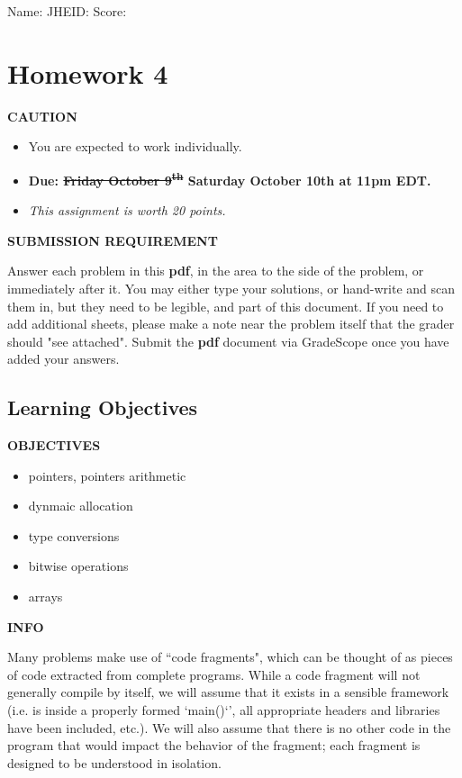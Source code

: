 \documentclass[12pt]{article}
\def \HWNumber {4}
\def \HWDueDate {\sout{Friday October 9\textsuperscript{th}} Saturday October 10th at 11pm EDT}
\newenvironment{caution}{\par\begin{mdframed}[linewidth=1pt,linecolor=YellowOrange]%
		\begin{list}{}{\leftmargin=0cm}\item[\Large\bcdanger]}
		{\end{list}\end{mdframed}\par}
\newenvironment{danger}{\par\begin{mdframed}[linewidth=1pt,linecolor=Red]%
		\begin{list}{}{\leftmargin=0cm}\item[\Large\bcbombe]}
		{\end{list}\end{mdframed}\par}
\newenvironment{tip}{\par\begin{mdframed}[linewidth=1pt,linecolor=ForestGreen]%
		\begin{list}{}{\leftmargin=0cm}\item[\Large\bclampe]}
		{\end{list}\end{mdframed}\par}
\newenvironment{info}{\par\begin{mdframed}[linewidth=1pt,linecolor=Cerulean]%
		\begin{list}{}{\leftmargin=0cm}\item[\Large\bcinfo]}
		{\end{list}\end{mdframed}\par}
\def \SName {}
\def \JHEID {}
\begin{document}
\noindent Name: \framebox[5.5cm]{\SName\rule{0pt}{12pt}} \hfill
JHEID: \framebox[3cm]{\JHEID\rule{0pt}{12pt}}\hfill
Score: \framebox[2cm]{\rule{0pt}{12pt}}

\section*{Homework \HWNumber}

\begin{caution}
	\textbf{CAUTION}
	
	\begin{itemize}
		\item You are expected to work individually.
		\item \textbf{Due: \HWDueDate.}
		\item \textit{This assignment is worth 20 points. }
	\end{itemize}
\end{caution}

\begin{danger}
	\textbf{SUBMISSION REQUIREMENT}
	
	Answer each problem in this \textbf{pdf}, in the area to the side of the problem, or immediately after it.  You may either type your solutions, or hand-write and scan them in, but they need to be legible, and part of this document. If you need to add additional sheets, please make a note near the problem itself that the grader should "see attached". Submit the \textbf{pdf} document via GradeScope once you have added your answers.
\end{danger}

\subsection*{Learning Objectives}
\begin{tip}
	\textbf{OBJECTIVES}
	
	\begin{itemize}
		\item pointers, pointers arithmetic
		\item dynmaic allocation
		\item type conversions
		\item bitwise operations
		\item arrays
	\end{itemize}
\end{tip}

\begin{info}
	\textbf{INFO}
	
	Many problems make use of “code fragments", which can be thought of as pieces of code extracted from complete programs. While a code fragment will not generally compile by itself, we will assume that it exists in a sensible framework (i.e. is inside a properly formed `main()`', all appropriate headers and libraries have been included, etc.). We will also assume that there is no other code in the program that would impact the behavior of the fragment; each fragment is designed to be understood in isolation.
\end{info}
\end{document}
